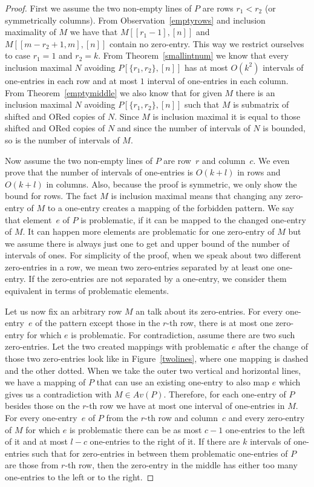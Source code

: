 \begin{proof}
First we assume the two non-empty lines of $P$ are rows $r_1<r_2$ (or symmetrically columns). From Observation~\ref{emptyrows} and inclusion maximality of $M$ we have that $M[[r_1-1],[n]]$ and $M[[m-r_2+1,m],[n]]$ contain no zero-entry. This way we restrict ourselves to case $r_1=1$ and $r_2=k$. From Theorem~\ref{smallintnum} we know that every inclusion maximal $N$ avoiding $P[\{r_1,r_2\},[n]]$ has at most $O(k^2)$ intervals of one-entries in each row and at most $1$ interval of one-entries in each column. From Theorem~\ref{emptymiddle} we also know that for given $M$ there is an inclusion maximal $N$ avoiding $P[\{r_1,r_2\},[n]]$ such that $M$ is submatrix of shifted and ORed copies of $N$. Since $M$ is inclusion maximal it is equal to those shifted and ORed copies of $N$ and since the number of intervals of $N$ is bounded, so is the number of intervals of $M$.

Now assume the two non-empty lines of $P$ are row~$r$ and column~$c$. We even prove that the number of intervals of one-entries is $O(k+l)$ in rows and $O(k+l)$ in columns. Also, because the proof is symmetric, we only show the bound for rows. The fact $M$ is inclusion maximal means that changing any zero-entry of $M$ to a one-entry creates a mapping of the forbidden pattern. We say that element~$e$ of $P$ is problematic, if it can be mapped to the changed one-entry of $M$. It can happen more elements are problematic for one zero-entry of $M$ but we assume there is always just one to get and upper bound of the number of intervals of ones. For simplicity of the proof, when we speak about two different zero-entries in a row, we mean two zero-entries separated by at least one one-entry. If the zero-entries are not separated by a one-entry, we consider them equivalent in terms of problematic elements.

Let us now fix an arbitrary row $M$ an talk about its zero-entries. For every one-entry~$e$ of the pattern except those in the $r$-th row, there is at most one zero-entry for which $e$ is problematic. For contradiction, assume there are two such zero-entries. Let the two created mappings with problematic $e$ after the change of those two zero-entries look like in Figure~\ref{twolines}, where one mapping is dashed and the other dotted. When we take the outer two vertical and horizontal lines, we have a mapping of $P$ that can use an existing one-entry to also map $e$ which gives us a contradiction with $M\in Av(P)$. Therefore, for each one-entry of $P$ besides those on the $r$-th row we have at most one interval of one-entries in $M$. For every one-entry~$e$ of $P$ from the $r$-th row and column~$c$ and every zero-entry of $M$ for which $e$ is problematic there can be as most $c-1$ one-entries to the left of it and at most $l-c$ one-entries to the right of it. If there are $k$ intervals of one-entries such that for zero-entries in between them problematic one-entries of $P$ are those from $r$-th row, then the zero-entry in the middle has either too many one-entries to the left or to the right.
\end{proof}
